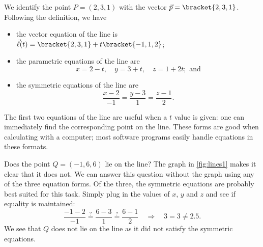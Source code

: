{We identify the point $P=(2,3,1)$ with the vector $\vec p =\bracket{2,3,1}$. Following the definition, we have
\begin{itemize}
	\item the vector equation of the line is $\vec\ell(t) =\bracket{2,3,1}+ t\bracket{-1,1,2}$;
	\item	the parametric equations of the line are
	\[x = 2-t,\quad y = 3+t,\quad z = 1+2t; \text{ and}\]
	\item	the symmetric equations of the line are
	\[\frac{x-2}{-1}=\frac{y-3}{1} = \frac{z-1}{2}.\]
\end{itemize}

The first two equations of the line are useful when a $t$ value is given: one can immediately find the corresponding point on the line. These forms are good when calculating with a computer; most software programs easily handle equations in these formats.


Does the point $Q = (-1,6,6)$ lie on the line? The graph in \autoref{fig:lines1} makes it clear that it does not. We can answer this question without the graph using any of the three equation forms. Of the three, the symmetric equations are probably best suited for this task. Simply plug in the values of $x$, $y$ and $z$ and see if equality is maintained:
\[
\frac{-1-2}{-1} \stackrel{?}{=} \frac{6-3}{1} \stackrel{?}{=} \frac{6-1}{2}
\quad \Rightarrow \quad 3=3\neq2.5.
\]
We see that $Q$ does not lie on the line as it did not satisfy the symmetric equations.}

